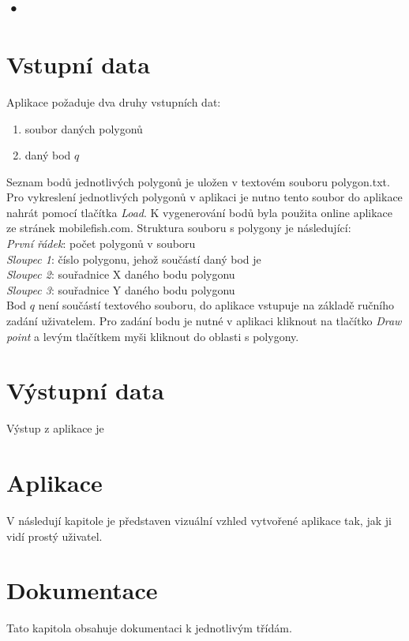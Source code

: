 \documentclass[a4paper, 12pt]{article}
\begin{document}
\subsection{•}

\section{Vstupní data}
Aplikace požaduje dva druhy vstupních dat:

\begin{enumerate}
\item soubor daných polygonů
\item daný bod $q$
\end{enumerate}

Seznam bodů jednotlivých polygonů je uložen v textovém souboru polygon.txt. Pro vykreslení jednotlivých polygonů v aplikaci je nutno tento soubor do aplikace nahrát pomocí tlačítka \textsl{Load}. K vygenerování bodů byla použita online aplikace ze stránek mobilefish.com. Struktura souboru s polygony je následující:\\

\noindent
\textsl{První řádek}: počet polygonů v souboru\\
\textsl{Sloupec 1}: číslo polygonu, jehož součástí daný bod je\\
\textsl{Sloupec 2}: souřadnice X daného bodu polygonu\\
\textsl{Sloupec 3}: souřadnice Y daného bodu polygonu\\

Bod $q$ není součástí textového souboru, do aplikace vstupuje na základě ručního zadání uživatelem. Pro zadání bodu je nutné v aplikaci kliknout na tlačítko \textsl{Draw point} a levým tlačítkem myši kliknout do oblasti s polygony.

\section{Výstupní data}
Výstup z aplikace je


\section{Aplikace}
V následují kapitole je představen vizuální vzhled vytvořené aplikace tak, jak ji vidí prostý uživatel.


\section{Dokumentace}
Tato kapitola obsahuje dokumentaci k jednotlivým třídám.
\end{document}
